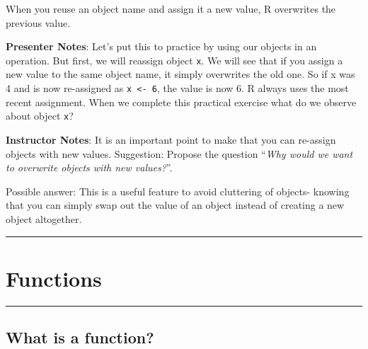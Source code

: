 \documentclass[
  letterpaper,
  DIV=11,
  numbers=noendperiod]{scrartcl}
\begin{document}
\begin{tcolorbox}[enhanced jigsaw, arc=.35mm, bottomrule=.15mm, bottomtitle=1mm, breakable, colback=white, colbacktitle=quarto-callout-tip-color!10!white, colframe=quarto-callout-tip-color-frame, coltitle=black, left=2mm, leftrule=.75mm, opacityback=0, opacitybacktitle=0.6, rightrule=.15mm, title=\textcolor{quarto-callout-tip-color}{\faLightbulb}\hspace{0.5em}{Object reassignment}, titlerule=0mm, toprule=.15mm, toptitle=1mm]

When you reuse an object name and assign it a new value, R overwrites
the previous value.

\end{tcolorbox}

\textbf{Presenter Notes}: Let's put this to practice by using our
objects in an operation. But first, we will reassign object \texttt{x}.
We will see that if you assign a new value to the same object name, it
simply overwrites the old one. So if x was 4 and is now re-assigned as
\texttt{x\ \textless{}-\ 6}, the value is now 6. R always uses the most
recent assignment. When we complete this practical exercise what do we
observe about object \texttt{x}?

\textbf{Instructor Notes}: It is an important point to make that you can
re-assign objects with new values. Suggestion: Propose the question
``\emph{Why would we want to overwrite objects with new values?}''.

Possible answer: This is a useful feature to avoid cluttering of
objects- knowing that you can simply swap out the value of an object
instead of creating a new object altogether.

\begin{center}\rule{0.5\linewidth}{0.5pt}\end{center}

\section{Functions}\label{functions}

\begin{center}\rule{0.5\linewidth}{0.5pt}\end{center}

\subsection{What is a function?}\label{what-is-a-function}
\end{document}
